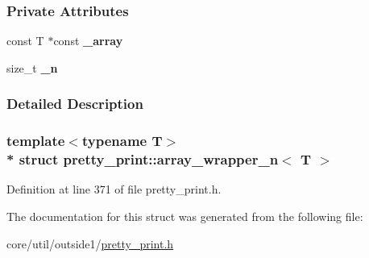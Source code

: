 \subsubsection*{Private Attributes}
\begin{DoxyCompactItemize}
\item 
const T $\ast$const {\bfseries \+\_\+array}\hypertarget{structpretty__print_1_1array__wrapper__n_a1c624bd8bff553e7e0f2c85916dbff7f}{}\label{structpretty__print_1_1array__wrapper__n_a1c624bd8bff553e7e0f2c85916dbff7f}

\item 
size\+\_\+t {\bfseries \+\_\+n}\hypertarget{structpretty__print_1_1array__wrapper__n_a06bcddab367c8b7b86369728065a7f01}{}\label{structpretty__print_1_1array__wrapper__n_a06bcddab367c8b7b86369728065a7f01}

\end{DoxyCompactItemize}


\subsubsection{Detailed Description}
\subsubsection*{template$<$typename T$>$\\*
struct pretty\+\_\+print\+::array\+\_\+wrapper\+\_\+n$<$ T $>$}



Definition at line 371 of file pretty\+\_\+print.\+h.



The documentation for this struct was generated from the following file\+:\begin{DoxyCompactItemize}
\item 
core/util/outside1/\hyperlink{pretty__print_8h}{pretty\+\_\+print.\+h}\end{DoxyCompactItemize}
